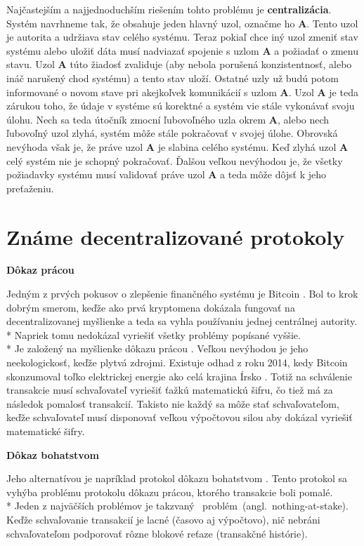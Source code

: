 Najčastejším a najjednoduchším riešením tohto problému je \textbf{centralizácia}.
Systém navrhneme tak, že obsahuje jeden hlavný uzol, označme ho $\textbf{A}$.
Tento uzol je autorita a udržiava stav celého systému.
Teraz pokiaľ chce iný uzol zmeniť stav systému alebo uložiť dáta musí
nadviazať spojenie s uzlom $\textbf{A}$ a požiadať o zmenu stavu. Uzol $\textbf{A}$ túto žiadosť
zvaliduje (aby nebola porušená konzistentnosť, alebo ináč narušený chod systému)
a tento stav uloží. Ostatné uzly už budú potom informované o novom stave pri
akejkoľvek komunikácií s uzlom $\textbf{A}$.
Uzol $\textbf{A}$ je teda zárukou toho, že údaje v systéme sú korektné a systém vie stále
vykonávať svoju úlohu.
Nech sa teda útočník zmocní ľubovoľného uzla okrem $\textbf{A}$, alebo nech ľubovoľný uzol
zlyhá, systém môže stále pokračovať v svojej úlohe.
Obrovská nevýhoda však je, že práve uzol $\textbf{A}$ je slabina celého systému. Keď zlyhá
uzol $\textbf{A}$ celý systém nie je schopný pokračovať. Ďalšou veľkou nevýhodou je, že
všetky požiadavky systému musí validovať práve uzol $\textbf{A}$ a teda môže dôjsť k jeho
preťaženiu.

\section {Známe decentralizované protokoly}

\begin{flushleft}\textbf {Dôkaz prácou}\end{flushleft}
\vspace{-4mm}
Jedným z prvých pokusov o zlepšenie finančného systému je Bitcoin
\cite{nakamoto2009bitcoin}.
Bol to krok dobrým smerom, keďže ako prvá kryptomena dokázala fungovať na 
decentralizovanej myšlienke a teda sa vyhla používaniu jednej centrálnej autority.
\\*
Napriek tomu nedokázal vyriešiť všetky problémy popísané
vyššie.
\\*
Je založený na myšlienke dôkazu prácou \cite{dwork1992pricing}.
Veľkou nevýhodou je jeho neekologickosť, keďže plytvá zdrojmi. Existuje odhad z
roku 2014, kedy Bitcoin skonzumoval toľko elektrickej energie ako celá krajina
Írsko \cite{malone2014bitcoin}. Totiž na schválenie transakcie musí schvaľovateľ vyriešiť ťažkú
matematickú šifru, čo tiež má za následok pomalosť transakcií. Takisto nie každý
sa môže stať schvaľovateľom, keďže schvaľovateľ musí disponovať veľkou
výpočtovou silou aby dokázal vyriešiť matematické šifry.

\begin{flushleft}\textbf {Dôkaz bohatstvom}\end{flushleft}
\vspace{-4mm}
Jeho alternatívou je napríklad protokol dôkazu bohatstvom \cite{king2012ppcoin}. Tento
protokol sa vyhýba problému protokolu dôkazu prácou, ktorého transakcie boli
pomalé.
\\*
Jeden z najväčších problémov je takzvaný \mbox{\thinspace
problém (angl. nothing-at-stake).}
Keďže schvaľovanie transakcií je lacné (časovo aj výpočtovo),
nič nebráni schvaľovateľom podporovať rôzne blokové reťaze (transakčné
histórie).

